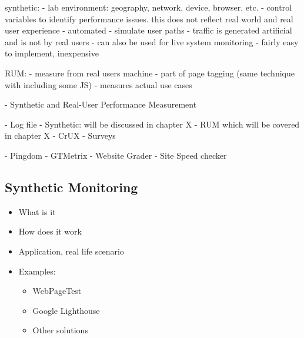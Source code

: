 synthetic:
- lab environment: geography, network, device, browser, etc.
- control variables to identify performance issues. this does not reflect real world and real user experience
- automated
- simulate user paths
- traffic is generated artificial and is not by real users
 - can also be used for live system monitoring
 - fairly easy to implement, inexpensive

RUM:
- measure from real users machine
- part of page tagging (same technique with including some JS)
- measures actual use cases



- Synthetic and Real-User Performance Measurement



- Log file
- Synthetic: will be discussed in chapter X
- RUM which will be covered in chapter X
- CrUX
- Surveys


- Pingdom
- GTMetrix
- Website Grader
- Site Speed checker























\subsection{Synthetic Monitoring}

\begin{itemize}
    \item What is it
    \item How does it work
    \item Application, real life scenario
    \item Examples:
    \begin{itemize}
        \item WebPageTest
        \item Google Lighthouse
        \item Other solutions
    \end{itemize}
\end{itemize}













